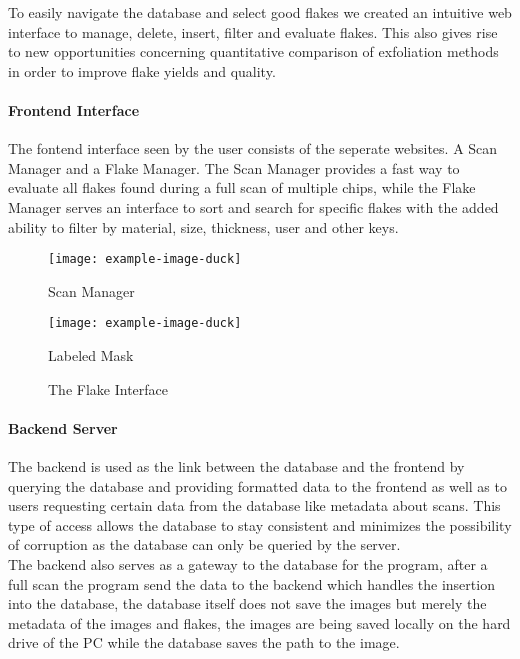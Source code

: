To easily navigate the database and select good flakes we created an intuitive web interface to manage, delete, insert, filter and evaluate flakes. This also gives rise to new opportunities concerning quantitative comparison of exfoliation methods in order to improve flake yields and quality.


\paragraph{Frontend Interface}
The fontend interface seen by the user consists of the seperate websites.
A Scan Manager and a Flake Manager.
The Scan Manager provides a fast way to evaluate all flakes found during a full scan of multiple chips, while the Flake Manager serves an interface to sort and search for specific flakes with the added ability to filter by material, size, thickness, user and other keys.

\begin{figure}[h]
\centering
\begin{minipage}{.45\textwidth}
  \centering
  \texttt{[image: example-image-duck]}
  \caption{Scan Manager}
\end{minipage}
\begin{minipage}{.45\textwidth}
  \centering
  \texttt{[image: example-image-duck]}
    \caption{Labeled Mask}
\end{minipage}
\caption{The Flake Interface}
\end{figure}

\paragraph{Backend Server}
The backend is used as the link between the database and the frontend by querying the database and providing formatted data to the frontend as well as to users requesting certain data from the database like metadata about scans.
This type of access allows the database to stay consistent and minimizes the possibility of corruption as the database can only be queried by the server.\\
The backend also serves as a gateway to the database for the program, after a full scan the program send the data to the backend which handles the insertion into the database, the database itself does not save the images but merely the metadata of the images and flakes, the images are being saved locally on the hard drive of the PC while the database saves the path to the image.